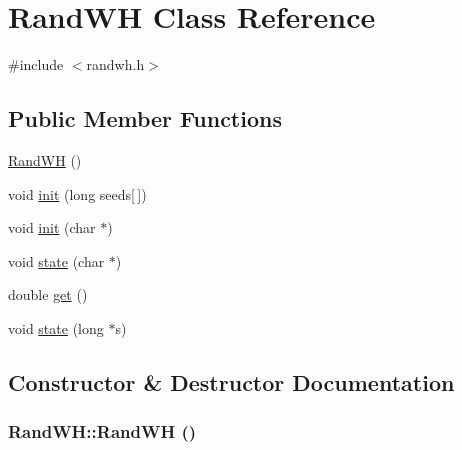 \hypertarget{classRandWH}{
\section{RandWH Class Reference}
\label{classRandWH}
}


{\ttfamily \#include $<$randwh.h$>$}

\subsection*{Public Member Functions}
\begin{DoxyCompactItemize}
\item 
\hyperlink{classRandWH_ae9f57a6a9673f324f2403a51f03a9280}{RandWH} ()
\item 
void \hyperlink{classRandWH_a8c373ceb6c13088ae8053b9c5f79ccea}{init} (long seeds\mbox{[}$\,$\mbox{]})
\item 
void \hyperlink{classRandWH_ae18fe372528b36f76ed3c36ed4e8ebbf}{init} (char $\ast$)
\item 
void \hyperlink{classRandWH_a98737ce014ca577b4ab6af733a8056f9}{state} (char $\ast$)
\item 
double \hyperlink{classRandWH_aee09f663e825d7cd6f66eb8bd0200112}{get} ()
\item 
void \hyperlink{classRandWH_a3daac6243983e16e361f763ac0748777}{state} (long $\ast$s)
\end{DoxyCompactItemize}


\subsection{Constructor \& Destructor Documentation}
\hypertarget{classRandWH_ae9f57a6a9673f324f2403a51f03a9280}{
\subsubsection[{RandWH}]{\setlength{\rightskip}{0pt plus 5cm}RandWH::RandWH ()}}
\label{classRandWH_ae9f57a6a9673f324f2403a51f03a9280}


